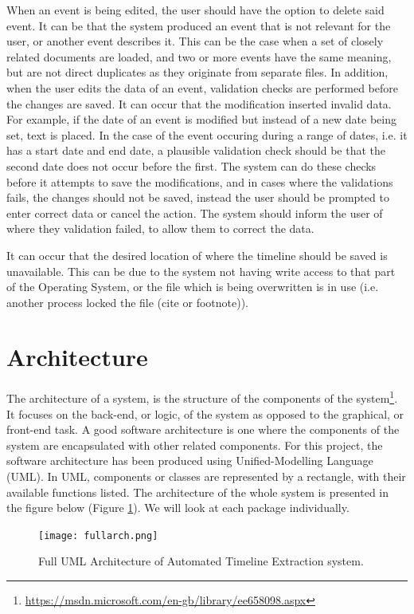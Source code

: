 \par When an event is being edited, the user should have the option to delete said event. It can be that the system produced an event that is not relevant for the user, or another event describes it. This can be the case when a set of closely related documents are loaded, and two or more events have the same meaning, but are not direct duplicates as they originate from separate files. In addition, when the user edits the data of an event, validation checks are performed before the changes are saved. It can occur that the modification inserted invalid data. For example, if the date of an event is modified but instead of a new date being set, text is placed. In the case of the event occuring during a range of dates, i.e. it has a start date and end date, a plausible validation check should be that the second date does not occur before the first. The system can do these checks before it attempts to save the modifications, and in cases where the validations fails, the changes should not be saved, instead the user should be prompted to enter correct data or cancel the action. The system should inform the user of where they validation failed, to allow them to correct the data.
\par It can occur that the desired location of where the timeline should be saved is unavailable. This can be due to the system not having write access to that part of the Operating System, or the file which is being overwritten is in use (i.e. another process locked the file (cite or footnote)).
\section{Architecture}
\par The architecture of a system, is the structure of the components of the system\footnote{\url{https://msdn.microsoft.com/en-gb/library/ee658098.aspx}}. It focuses on the back-end, or logic, of the system as opposed to the graphical, or front-end task. A good software architecture is one where the components of the system are encapsulated with other related components. For this project, the software architecture has been produced using Unified-Modelling Language (UML). In UML, components or classes are represented by a rectangle, with their available functions listed. The architecture of the whole system is presented in the figure below (Figure \ref{fig:fullArch}). We will look at each package individually.
\begin{figure}[H]
\caption{Full UML Architecture of Automated Timeline Extraction system.}
\label{fig:fullArch}
\texttt{[image: fullarch.png]}
\centering
\end{figure}
